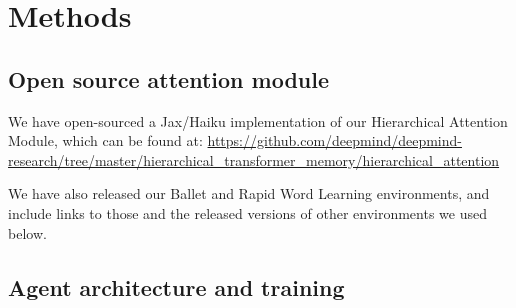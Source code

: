 \appendix


\section{Methods} 

\subsection{Open source attention module} \label{app:methods:opensource}

We have open-sourced a Jax/Haiku implementation of our Hierarchical Attention Module, which can be found at: \url{https://github.com/deepmind/deepmind-research/tree/master/hierarchical_transformer_memory/hierarchical_attention}

We have also released our Ballet and Rapid Word Learning environments, and include links to those and the released versions of other environments we used below. 

\subsection{Agent architecture and training} \label{app:methods:agents}

